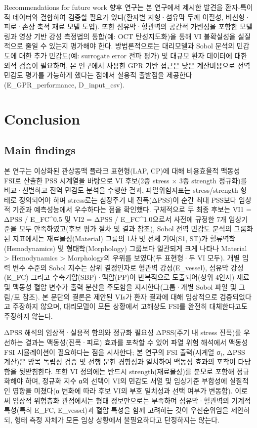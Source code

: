 \documentclass[preprint,12pt]{elsarticle}
\begin{document}
Recommendations for future work
향후 연구는 본 연구에서 제시한 발견을 환자-특이적 데이터와 결합하여 검증할 필요가 있다(환자별 지형·섬유막 두께 이질성, 비선형·피로·손상 축적 재료 모델 도입). 또한 섬유막·혈관벽의 공간적 가변성을 포함한 모델링과 영상 기반 강성 측정법의 통합(예: OCT 탄성지도화)을 통해 VI 불확실성을 실질적으로 줄일 수 있는지 평가해야 한다. 방법론적으로는 대리모델과 Sobol 분석의 민감도에 대한 추가 민감도(예: surrogate error 전파 평가) 및 대규모 환자 데이터에 대한 외적 검증이 필요하며, 본 연구에서 사용한 GPR 기반 접근은 낮은 계산비용으로 전역 민감도 평가를 가능하게 했다는 점에서 실용적 출발점을 제공한다(E\_GPR\_performance, D\_input\_csv).

\section{Conclusion}

\subsection{Main findings}
본 연구는 이상화된 관상동맥 플라크 표현형(LAP, CP)에 대해 비용효율적 맥동성 FSI로 산출한 PSS 시계열을 바탕으로 VI 후보(2종 stress × 3종 strength 정규화)를 비교·선별하고 전역 민감도 분석을 수행한 결과, 파열위험지표는 stress/strength 형태로 정의되어야 하며 stress로는 심장주기 내 진폭(ΔPSS)이 순간 최대 PSS보다 임상적 기준과 예측성능에서 우수하다는 점을 확인했다. 구체적으로 두 최종 후보는 VI1 = ΔPSS / E\_FC\textasciicircum {0.5} 및 VI2 = ΔPSS / E\_FC\textasciicircum {1.0}으로서 사전에 규정한 7개 임상기준을 모두 만족하였고(후보 평가 절차 및 결과 참조), Sobol 전역 민감도 분석의 그룹화된 지표에서는 재료물성(Material) 그룹의 1차 및 전체 기여(S1, ST)가 혈류역학(Hemodynamics) 및 형태학(Morphology) 그룹보다 일관되게 크게 나타나 Material > Hemodynamics > Morphology의 우위를 보였다(두 표현형·두 VI 모두). 개별 입력 변수 수준의 Sobol 지수는 상위 결정인자로 혈관벽 강성(E\_vessel), 섬유막 강성(E\_FC) 그리고 수축기압(SBP)·맥압(PP)이 반복적으로 도출되어(상위 4인자) 재료 및 맥동성 혈압 변수가 출력 분산을 주도함을 지시한다(그룹·개별 Sobol 파일 및 그림/표 참조). 본 문단의 결론은 제안된 VIs가 환자 결과에 대해 임상적으로 검증되었다고 주장하지 않으며, 대리모델이 모든 상황에서 고해상도 FSI를 완전히 대체한다고도 주장하지 않는다.

ΔPSS 해석의 임상적·실용적 함의와 정규화 필요성
ΔPSS(주기 내 stress 진폭)를 우선하는 결과는 맥동성(진폭·피로) 효과를 포착할 수 있어 파열 위험 해석에서 맥동성 FSI 시뮬레이션이 필요하다는 점을 시사한다; 본 연구의 FSI 출력(시계열 σ₁, ΔPSS 계산)은 망목 독립성 검증 및 선행 문헌 경향성과 일치하여 맥동성 효과의 포착이 타당함을 뒷받침한다. 또한 VI 정의에는 반드시 strength(재료물성)를 분모로 포함해 정규화해야 하며, 정규화 지수 α의 선택이 VI의 민감도 서열 및 임상기준 부합성에 실질적인 영향을 미쳤다(α 변화에 따라 후보 VI의 부호 일치성과 선택 여부가 변동함). 이로써 임상적 위험층화 관점에서는 형태 정보만으로는 부족하며 섬유막·혈관벽의 기계적 특성(특히 E\_FC, E\_vessel)과 혈압 특성을 함께 고려하는 것이 우선순위임을 제안하되, 형태 측정 자체가 모든 임상 상황에서 불필요하다고 단정하지는 않는다.
\end{document}
